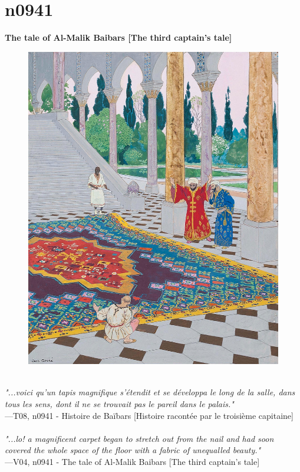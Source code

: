 \documentclass[../Carre_nights.tex]{subfiles}
\begin{document}
\newpage

\section{n0941}
\textbf{\Large{The tale of Al-Malik Baibars [The third captain’s tale]}} \\

\begin{figure}[ht]
\centering
\includegraphics[height=\figsize]{illustrations/volume_8/T08, n0941 - Histoire de Baïbars [Histoire racontée par le troisième capitaine].jpg}
\end{figure}

\textit{\\
"...voici qu’un tapis magnifique s’étendit et se développa le long de la salle, dans tous les sens, dont il ne se trouvait pas le pareil dans le palais."} \\
—T08, n0941 - Histoire de Baïbars [Histoire racontée par le troisième capitaine] \\~\\
\textit{"...lo! a magnificent carpet began to stretch out from the nail and had soon covered the whole space of the floor with a fabric of unequalled beauty."} \\
—V04, n0941 - The tale of Al-Malik Baibars [The third captain’s tale]
\end{document}
